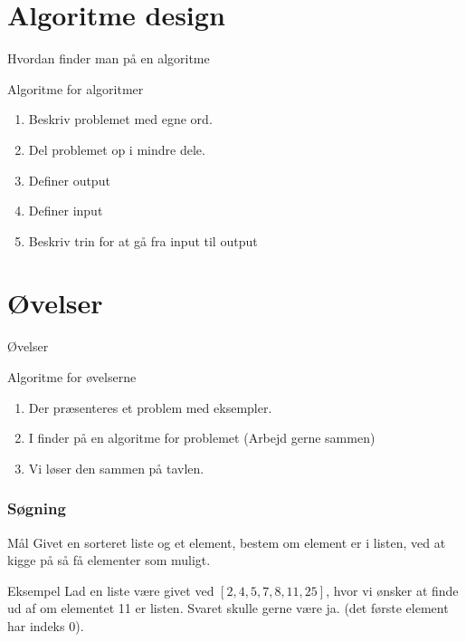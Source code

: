 \documentclass[12pt,t]{beamer}
\begin{document}
\section{Algoritme design}
    \begin{frame}[c]{Hvordan finder man på en algoritme}
        \begin{block}{Algoritme for algoritmer}
            \begin{enumerate}
                \item Beskriv problemet med egne ord. \pause
                \item Del problemet op i mindre dele. \pause
                \item Definer output \pause
                \item Definer input \pause
                \item Beskriv trin for at gå fra input til output
            \end{enumerate}
        \end{block}
    \end{frame}


\section{Øvelser}
        \begin{frame}[t]{Øvelser}
            \begin{block}{Algoritme for øvelserne}
                \begin{enumerate}
                    \item Der præsenteres et problem med eksempler. \pause
                    \item I finder på en algoritme for problemet
                          (Arbejd gerne sammen) \pause
                    \item Vi løser den sammen på tavlen.
                \end{enumerate}
            \end{block}
        \end{frame}

    \begin{frame}
      \frametitle{Søgning}
      \begin{block}{Mål}
      Givet en sorteret liste og et element, bestem om element er i listen,
      ved at kigge på så få elementer som muligt.
      \end{block}
      \pause

      \begin{exampleblock}{Eksempel}
      Lad en liste være givet ved $[2, 4, 5, 7, 8, 11, 25]$, hvor vi ønsker at
      finde ud af om elementet 11 er listen. Svaret skulle gerne være ja.
      (det første element har indeks 0).
      \end{exampleblock}
    \end{frame}
\end{document}
